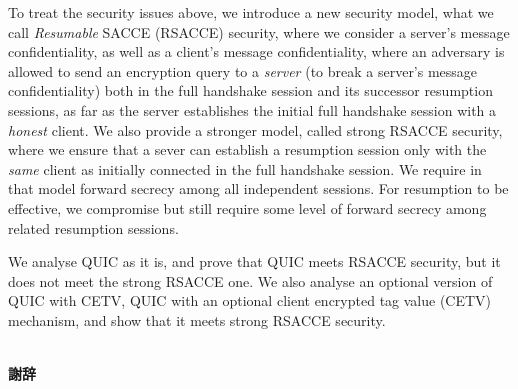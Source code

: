 \documentclass[11pt,a4j]{jarticle}
\def\thanks{~\\[.5\baselineskip]{\bf 謝辞}\hspace*{1zw}}
\begin{document}
To treat the security issues above,
we introduce a new security model, what we call \textit{Resumable} SACCE (RSACCE) security,
where we consider a server's message confidentiality, as well as a client's message confidentiality,
where an adversary is allowed to send an encryption query to a \textit{server}
(to break a server's message confidentiality)
both in the full handshake session and its successor resumption sessions,
as far as the server establishes the initial full handshake session
with a \textit{honest} client.
We also provide a stronger model, called strong RSACCE security,
where we ensure that a sever can establish a resumption session only with the \textit{same} client as
initially connected in the full handshake session.
We require in that model forward secrecy among all independent sessions.
For resumption to be effective, we compromise but still require
some level of forward secrecy among related resumption sessions.


%
We analyse QUIC as it is, and prove that QUIC meets RSACCE security, but it does not meet
the strong RSACCE one.
We also analyse an optional version of QUIC with CETV, QUIC with an optional client encrypted tag value
(CETV) mechanism, and show that it meets strong RSACCE security.

\thanks
%
\dotfill \\ \dotfill



\end{document}
